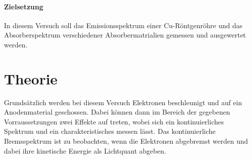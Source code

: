 
\paragraph{Zielsetzung}
In diesem Versuch soll das Emissionsspektrum einer Cu-Röntgenröhre und
das Absorberspektrum verschiedener Absorbermatrialien gemessen und ausgewertet
werden.

\section{Theorie}
\label{sec:Theorie}
Grundsätzlich werden bei diesem Versuch Elektronen beschleunigt und auf ein
Anodenmaterial geschossen. Dabei können dann im Bereich der gegebenen Vorraussetzungen
zwei Effekte auf treten, wobei sich ein kontinuierliches Spektrum und ein
charakteristisches messen lässt. Das kontinuierliche Bremsspektrum ist zu
beobachten, wenn die Elektronen abgebremst werden und dabei ihre kinetische
Energie als Lichtquant abgeben. 

